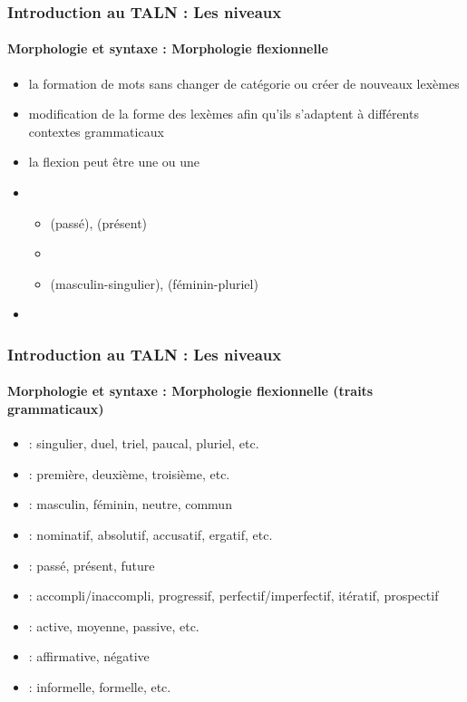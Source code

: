 \documentclass{beamer}
\begin{document}
\begin{frame}
\frametitle{Introduction au TALN : Les niveaux}
\framesubtitle{Morphologie et syntaxe : Morphologie flexionnelle}

\begin{itemize}
	\item la formation de mots sans changer de catégorie ou créer de nouveaux lexèmes 
	\item modification de la forme des lexèmes afin qu'ils s'adaptent à différents contextes grammaticaux
	\item la flexion peut être une  ou une 
	\item {}
	\begin{itemize}
		\item {}  (passé),  (présent)
		\item {}
		\item {}  (masculin-singulier),  (féminin-pluriel)
	\end{itemize}
	\item {}  
	
\end{itemize}


\end{frame}

\begin{frame}
\frametitle{Introduction au TALN : Les niveaux}
\framesubtitle{Morphologie et syntaxe : Morphologie flexionnelle (traits grammaticaux)}

\begin{itemize}
	\item {} : singulier, duel, triel, paucal, pluriel, etc. 
	\item {} : première, deuxième, troisième, etc.
	\item {} : masculin, féminin, neutre, commun 
	\item {} : nominatif, absolutif, accusatif, ergatif, etc.
	\item {} : passé, présent, future
	\item {} : accompli/inaccompli, progressif, perfectif/imperfectif, itératif, prospectif
	\item {} : active, moyenne, passive, etc.
	\item {} : affirmative, négative
	\item {} : informelle, formelle, etc.
\end{itemize}

\end{frame}
\end{document}
